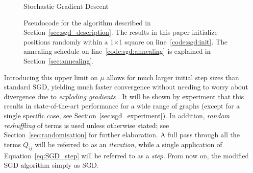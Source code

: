 \begin{figure}
  \removeAlgorithmFigureError
  \begin{algorithm}[H]
    
    \caption{Stochastic Gradient Descent}
    \label{alg:sgd}
  \end{algorithm}

  \caption[Pseudocode for stochastic gradient descent]{
  Pseudocode for the algorithm described in Section~\ref{sec:sgd_description}.
  The results in this paper initialize positions randomly within a 1$\times$1 square on line~\ref{code:sgd:init}.
  The annealing schedule on line~\ref{code:sgd:annealing} is explained in Section~\ref{sec:annealing}.
  }
  \label{fig:pseudo_sgd}
\end{figure}

Introducing this upper limit on $\mu$ allows for much larger initial step sizes than standard SGD, yielding much faster convergence without needing to worry about divergence due to \emph{exploding gradients} \cite{Goodfellow2016}. It will be shown by experiment that this results in state-of-the-art performance for a wide range of graphs (except for a single specific case, see Section~\ref{sec:sgd_experiment}).
In addition, \emph{random reshuffling} of terms is used unless otherwise stated; see Section~\ref{sec:randomisation} for further elaboration. A full pass through all the terms $Q_{ij}$ will be referred to as an \emph{iteration}, while a single application of Equation~\eqref{eq:SGD_step} will be referred to as a \emph{step}.
From now on, the modified SGD algorithm simply as SGD.

